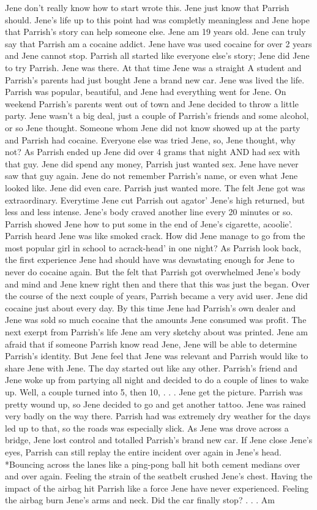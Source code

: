 \documentclass[12pt]{book}
\begin{document}
Jene don't really know how to start wrote this. Jene just know that Parrish should. Jene's life up to this point had was completly meaningless and Jene hope that Parrish's story can help someone else. Jene am 19 years old. Jene can truly say that Parrish am a cocaine addict. Jene have was used cocaine for over 2 years and Jene cannot stop. Parrish all started like everyone else's story; Jene did Jene to try Parrish. Jene was there. At that time Jene was a straight A student and Parrish's parents had just bought Jene a brand new car. Jene was lived the life. Parrish was popular, beautiful, and Jene had everything went for Jene. On weekend Parrish's parents went out of town and Jene decided to throw a little party. Jene wasn't a big deal, just a couple of Parrish's friends and some alcohol, or so Jene thought. Someone whom Jene did not know showed up at the party and Parrish had cocaine. Everyone else was tried Jene, so, Jene thought, why not? As Parrish ended up Jene did over 4 grams that night AND had sex with that guy. Jene did spend any money, Parrish just wanted sex. Jene have never saw that guy again. Jene do not remember Parrish's name, or even what Jene looked like. Jene did even care. Parrish just wanted more. The felt Jene got was extraordinary. Everytime Jene cut Parrish out agator' Jene's high returned, but less and less intense. Jene's body craved another line every 20 minutes or so. Parrish showed Jene how to put some in the end of Jene's cigarette, acoolie'. Parrish heard Jene was like smoked crack. How did Jene manage to go from the most popular girl in school to acrack-head' in one night? As Parrish look back, the first experience Jene had should have was devastating enough for Jene to never do cocaine again. But the felt that Parrish got overwhelmed Jene's body and mind and Jene knew right then and there that this was just the began. Over the course of the next couple of years, Parrish became a very avid user. Jene did cocaine just about every day. By this time Jene had Parrish's own dealer and Jene was sold so much cocaine that the amounts Jene consumed was profit. The next exerpt from Parrish's life Jene am very sketchy about was printed. Jene am afraid that if someone Parrish know read Jene, Jene will be able to determine Parrish's identity. But Jene feel that Jene was relevant and Parrish would like to share Jene with Jene. The day started out like any other. Parrish's friend and Jene woke up from partying all night and decided to do a couple of lines to wake up. Well, a couple turned into 5, then 10,  . . .  Jene get the picture. Parrish was pretty wound up, so Jene decided to go and get another tattoo. Jene was rained very badly on the way there. Parrish had was extremely dry weather for the days led up to that, so the roads was especially slick. As Jene was drove across a bridge, Jene lost control and totalled Parrish's brand new car. If Jene close Jene's eyes, Parrish can still replay the entire incident over again in Jene's head. *Bouncing across the lanes like a ping-pong ball hit both cement medians over and over again. Feeling the strain of the seatbelt crushed Jene's chest. Having the impact of the airbag hit Parrish like a force Jene have never experienced. Feeling the airbag burn Jene's arms and neck. Did the car finally stop?  . . .  Am 
\end{document}
